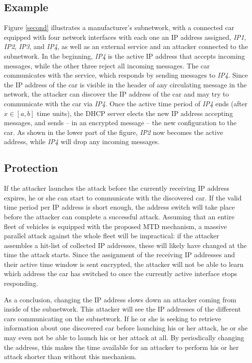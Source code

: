 \subsection{ Example}

Figure \ref{second} illustrates a manufacturer's subnetwork, with a
connected car equipped with four network interfaces with each one an
IP address assigned, \emph{IP1}, \emph{IP2}, \emph{IP3}, and \emph{IP4}, as well as an
external service and an attacker connected to the subnetwork. In the
beginning, \emph{IP4} is the active IP address that accepts incoming
messages, while the other three reject all incoming messages. The car
communicates with the service, which responds by sending messages to
\emph{IP4}. Since the IP address of the car is visible in the header of any
circulating message in the network, the attacker can discover the IP
address of the car and may try to communicate with the car via
\emph{IP4}. Once the active time period of \emph{IP4} ends (after $x \in [a,b]$
time units), the DHCP server elects the new IP address accepting
messages, and sends -- in an encrypted message -- the new
configuration to the car. As shown in the lower part of the figure,
\emph{IP2} now becomes the active address, while \emph{IP4} will drop any
incoming messages.


\subsection{Protection}

If the attacker launches the attack before the currently receiving IP
address expires, he or she can start to communicate with the
discovered car. If the valid time period per IP address is short
enough, the address switch will take place before the attacker can
complete a successful attack. Assuming that an entire fleet of
vehicles is equipped with the proposed MTD mechanism, a massive
parallel attack against the whole fleet will be impractical: if the
attacker assembles a hit-list of collected IP addresses, these will
likely have changed at the time the attack starts. Since the
assignment of the receiving IP addresses and their active time window
is sent encrypted, the attacker will not be able to learn which
address the car has switched to once the currently active interface
stops responding.


As a conclusion, changing the IP address slows down an attacker coming
from inside of the subnetwork. This attacker will see the IP addresses
of the different cars communicating on the subnetwork. If he or she is
seeking to retrieve information about one discovered car before
launching his or her attack, he or she may even not be able to launch
his or her attack at all. By periodically changing the address, this
makes the time available for an attacker to perform his or her attack
shorter than without this mechanism.

